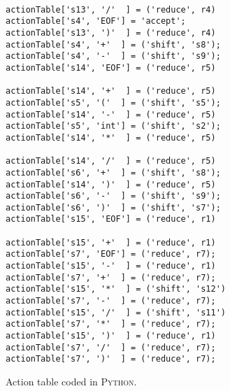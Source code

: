 \begin{figure}[!ht]
\begin{Verbatim}
                                             actionTable['s13', '/'  ] = ('reduce', r4)   
actionTable['s4', 'EOF'] = 'accept';         actionTable['s13', ')'  ] = ('reduce', r4)   
actionTable['s4', '+'  ] = ('shift', 's8');                                               
actionTable['s4', '-'  ] = ('shift', 's9');  actionTable['s14', 'EOF'] = ('reduce', r5)   
                                             actionTable['s14', '+'  ] = ('reduce', r5)   
actionTable['s5', '('  ] = ('shift', 's5');  actionTable['s14', '-'  ] = ('reduce', r5)   
actionTable['s5', 'int'] = ('shift', 's2');  actionTable['s14', '*'  ] = ('reduce', r5)   
                                             actionTable['s14', '/'  ] = ('reduce', r5)   
actionTable['s6', '+'  ] = ('shift', 's8');  actionTable['s14', ')'  ] = ('reduce', r5)   
actionTable['s6', '-'  ] = ('shift', 's9');                                               
actionTable['s6', ')'  ] = ('shift', 's7');  actionTable['s15', 'EOF'] = ('reduce', r1)   
                                             actionTable['s15', '+'  ] = ('reduce', r1)   
actionTable['s7', 'EOF'] = ('reduce', r7);   actionTable['s15', '-'  ] = ('reduce', r1)   
actionTable['s7', '+'  ] = ('reduce', r7);   actionTable['s15', '*'  ] = ('shift', 's12') 
actionTable['s7', '-'  ] = ('reduce', r7);   actionTable['s15', '/'  ] = ('shift', 's11') 
actionTable['s7', '*'  ] = ('reduce', r7);   actionTable['s15', ')'  ] = ('reduce', r1)   
actionTable['s7', '/'  ] = ('reduce', r7);
actionTable['s7', ')'  ] = ('reduce', r7);
\end{Verbatim}
\vspace*{-0.3cm}
\caption{Action table coded in \textsc{Python}.}
\label{fig:parse-table.stlx:action}
\end{figure}

 
